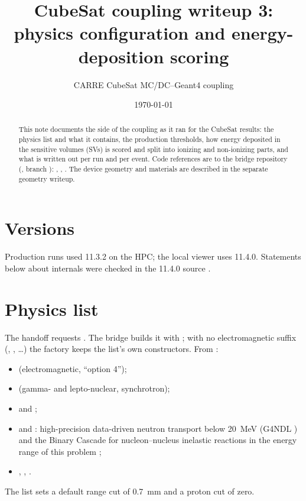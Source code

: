 

\title{CubeSat coupling writeup 3:\\\gfour{} physics configuration and energy-deposition scoring}
\author{CARRE CubeSat MC/DC--Geant4 coupling}
\date{\today}


\maketitle

\begin{abstract}
This note documents the \gfour{} side of the coupling as it ran for the CubeSat results: the physics list and what it contains, the production thresholds, how energy deposited in the sensitive volumes (SVs) is scored and split into ionizing and non-ionizing parts, and what is written out per run and per event. Code references are to the bridge repository (, branch ): , , . The device geometry and materials are described in the separate geometry writeup.
\end{abstract}

\section{Versions}
Production runs used \gfour{} 11.3.2 on the HPC; the local viewer uses 11.4.0. Statements below about \gfour{} internals were checked in the 11.4.0 source \citep{g4source}.

\section{Physics list}
The handoff requests . The bridge builds it with ; with no electromagnetic suffix (, , \ldots) the factory keeps the list's own constructors. From  \citep{g4source,g4physlistguide}:
\begin{itemize}
  \item {} (electromagnetic, ``option 4'');
  \item {} (gamma- and lepto-nuclear, synchrotron);
  \item {} and ;
  \item {} and : high-precision data-driven neutron transport below \SI{20}{MeV} (G4NDL \citep{mendoza2014g4ndl}) and the Binary Cascade for nucleon--nucleus inelastic reactions in the energy range of this problem \citep{folger2004binary};
  \item {}, , .
\end{itemize}
The list sets a default range cut of \SI{0.7}{mm} and a proton cut of zero.

